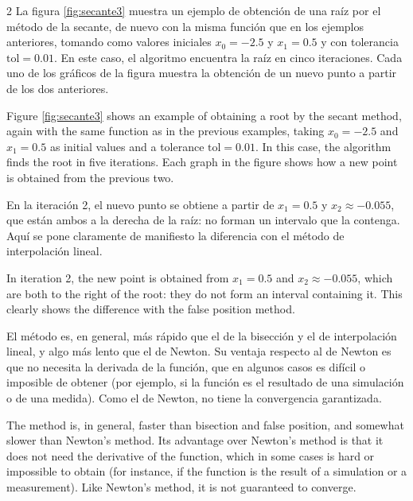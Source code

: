 \begin{paracol}{2}
La figura \ref{fig:secante3} muestra un ejemplo de obtención de una raíz por el método de la secante, de nuevo con la misma función que en los ejemplos anteriores, tomando como valores iniciales $x_0=-2.5$ y $x_1=0.5$ y con tolerancia $\text{tol}=0.01$. En este caso, el algoritmo encuentra la raíz en cinco iteraciones. Cada uno de los gráficos de la figura muestra la obtención de un nuevo punto a partir de los dos anteriores.

\switchcolumn
Figure \ref{fig:secante3} shows an example of obtaining a root by the secant method, again with the same function as in the previous examples, taking $x_0=-2.5$ and $x_1=0.5$ as initial values and a tolerance $\text{tol}=0.01$. In this case, the algorithm finds the root in five iterations. Each graph in the figure shows how a new point is obtained from the previous two.
\switchcolumn

En la iteración 2, el nuevo punto se obtiene a partir de $x_1=0.5$ y $x_2\approx-0.055$, que están ambos a la derecha de la raíz: no forman un intervalo que la contenga. Aquí se pone claramente de manifiesto la diferencia con el método de interpolación lineal.

\switchcolumn
In iteration 2, the new point is obtained from $x_1=0.5$ and $x_2\approx-0.055$, which are both to the right of the root: they do not form an interval containing it. This clearly shows the difference with the false position method.

\switchcolumn
 El método es, en general, más rápido que el de la bisección y el de interpolación lineal, y algo más lento que el de Newton. Su ventaja respecto al de Newton es que no necesita la derivada de la función, que en algunos casos es difícil o imposible de obtener (por ejemplo, si la función es el resultado de una simulación o de una medida). Como el de Newton, no tiene la convergencia garantizada.
\switchcolumn

 The method is, in general, faster than bisection and false position, and somewhat slower than Newton's method. Its advantage over Newton's method is that it does not need the derivative of the function, which in some cases is hard or impossible to obtain (for instance, if the function is the result of a simulation or a measurement). Like Newton's method, it is not guaranteed to converge.

\end{paracol}

